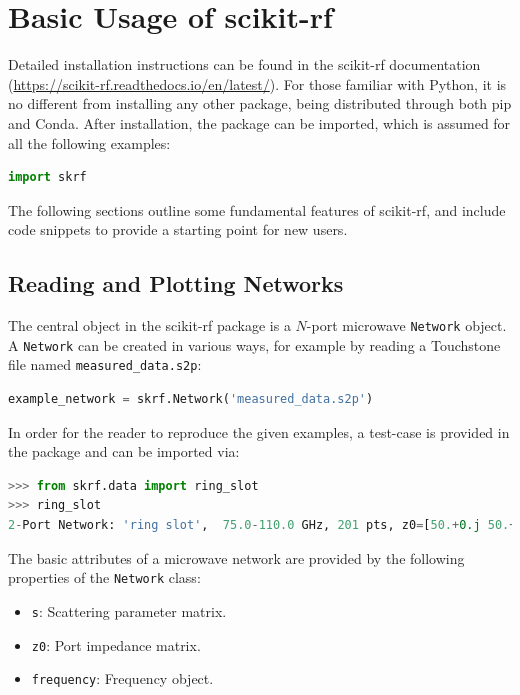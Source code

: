 \documentclass[10pt, letterpaper]{scrartcl}
\newcommand{\skrf}{{s}cikit-rf\xspace}
\begin{document}
\section{Basic Usage of \skrf{}}

Detailed installation instructions can be found in the \skrf{} documentation (\url{https://scikit-rf.readthedocs.io/en/latest/}). For those familiar with Python, it is no different from installing any other package, being distributed through both pip and Conda. After installation, the package can be imported, which is assumed for all the following examples:
\begin{lstlisting}[language=Python]
import skrf
\end{lstlisting}

The following sections outline some fundamental features of \skrf{}, and include code snippets to provide a starting point for new users.

\subsection{Reading and Plotting Networks}

The central object in the \skrf{} package is a $N$-port microwave \texttt{Network} object. A \texttt{Network} can be created in various ways, for example by reading a Touchstone file named \texttt{measured\_data.s2p}:

\begin{lstlisting}[language=Python]
example_network = skrf.Network('measured_data.s2p')
\end{lstlisting}

In order for the reader to reproduce the given examples, a test-case is provided in the package and can be imported via:

\begin{lstlisting}[language=Python]
>>> from skrf.data import ring_slot
>>> ring_slot
2-Port Network: 'ring slot',  75.0-110.0 GHz, 201 pts, z0=[50.+0.j 50.+0.j]
\end{lstlisting}

The basic attributes of a microwave network are provided by the following properties of the \texttt{Network} class:
\begin{itemize}
\item \texttt{s}: Scattering parameter matrix.
\item \texttt{z0}: Port impedance matrix.
\item \texttt{frequency}: Frequency object.
\end{itemize}
\end{document}
